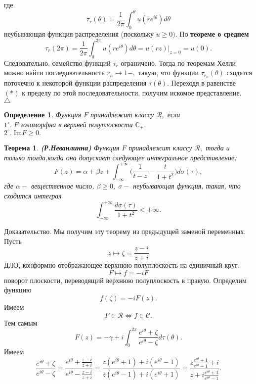 \documentclass[12pt,a4paper]{article}
\theoremstyle{plain}   \newtheorem{Pro}{Задача}
\newtheorem{Def}{Определение}
\newtheorem{The}{Теорема}
\begin{document}
где
$$
  \tau _r (\theta )=\frac{1}{2\pi} \int _0 ^ {\theta}
  u(re^{i\theta})d\theta
$$
неубывающая функция распределения (поскольку
$ u \geq 0). $
По
{\bfseries теореме о среднем}
$$
  \tau _r (2\pi )=\frac{1}{2\pi} \int _0 ^{2\pi}
  u(re^{i\theta})d\theta =
  u(rz)|_{z=0} = u(0).
$$
Следовательно, семейство функций
$ \tau _r $
ограничено. Тогда по теоремам Хелли можно найти последовательность
$ r_n \rightarrow 1- , $
такую, что функции
$ \tau _{r_n}(\theta ) $
сходятся поточечно к некоторой функции распределения
$ \tau (\theta ) . $
Переходя в равенстве
$ (\ast ) $
к пределу по этой последовательности, получим искомое представление.
\\
$ \triangle $
\begin{Def}
Функция
$ F $
принадлежит классу
$ \mathcal{R} , $
если\\
$ 1^{\circ}. \; F $
голоморфна в верхней полуплоскости
$ \mathbb{C}_+ , $
\\
$ 2^{\circ}. \; \mathrm{Im} F \geq 0 . $
\end{Def}
\begin{The}
{\bfseries (Р.Неванлинна)}
Функция
$ F $
принадлежит классу
$ \mathcal{R} , $
тогда и только тогда,когда она допускает следующее
интегральное представление:
$$
  F(z)=\alpha +\beta z + \int _{-\infty}^{+\infty}
  \biggl( \frac{1}{t-z} - \frac{t}{1+t^2} \biggr )
  d \sigma (\tau ) ,
$$
где
$ \alpha - $
вещественное число,
$ \beta \geq 0, \; \sigma - $
неубывающая функция, такая, что сходится интеграл
$$
  \int _{-\infty}^{+\infty}
  \frac{d\sigma (\tau )}{1+t^2} < + \infty .
$$
\end{The}
{\Large Доказательство.}
Мы получим эту теорему из предыдущей заменой переменных.
Пусть
$$
  z \mapsto \zeta =\frac{z-i}{z+i}
$$
ДЛО, конформно отображающее верхнюю полуплоскость на
единичный круг.
$$
  F \mapsto f=-iF
$$
поворот плоскости, переводящий верхнюю полуплоскость в правую.
Определим функцию
$$
  f(\zeta )=-iF(z).
$$
Имеем
$$
  F \in \mathcal{R} \Longleftrightarrow  f \in \mathcal{C}.
$$
Тем самым
$$
  F(z)=-\gamma +i \int _0 ^{2\pi}
  \frac{e^{i\theta}+\zeta}{e^{i\theta}-\zeta}
  d\tau (\theta ).
$$
Имеем
$$
  \frac{e^{i\theta}+\zeta}{e^{i\theta}-\zeta}=
  \frac{e^{i\theta}+\frac{z-i}{z+i}}
  {e^{i\theta}-\frac{z-i}{z+i}}=
  \frac{z ( e^{i\theta}+1)+i(e^{i\theta}-1)}
  {z(e^{i\theta}-1)+i(e^{i\theta}+1)}=
  \frac{z\frac{e^{i\theta}+1}{e^{i\theta}-1}+i}
  {z+i\frac{e^{i\theta}+1}{e^{i\theta}-1}}.
$$
\end{document}
